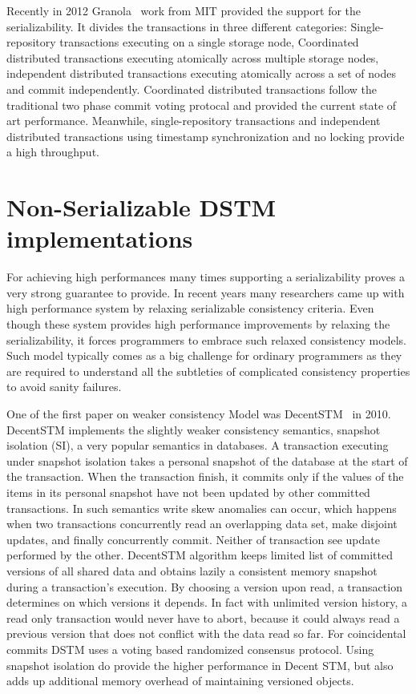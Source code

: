 \documentclass[12pt,english]{report}
\begin{document}
Recently in 2012 Granola~\cite{cowling2012granola} work from MIT provided the support for the serializability. It divides the transactions in three different categories: Single-repository transactions executing on a single storage node, Coordinated distributed transactions executing atomically across multiple storage nodes, independent distributed transactions executing atomically across a set of nodes and commit independently. Coordinated distributed transactions follow the traditional two phase commit voting protocal and provided the current state of art performance. Meanwhile, single-repository transactions and independent distributed transactions using timestamp synchronization and no locking provide a high throughput.  

\section{Non-Serializable DSTM implementations}

For achieving high performances many times supporting a serializability proves a very strong guarantee to provide. In recent years many researchers came up with high performance system by relaxing  serializable consistency criteria. Even though these system provides high performance improvements by relaxing the serializability, it forces programmers to embrace such relaxed consistency models. Such model typically comes as a big challenge for ordinary programmers as they are required to understand all the subtleties of complicated consistency properties to avoid sanity failures.

One of the first paper on weaker consistency Model was DecentSTM~\cite{DecentSTM:5470446} in 2010. DecentSTM implements the slightly weaker consistency semantics, snapshot isolation (SI), a very popular semantics in databases. A transaction executing under snapshot isolation takes a personal snapshot of the database at the start of the transaction. When the transaction finish, it commits only if the values of the items in its personal snapshot have not been updated by other committed transactions. In such semantics write skew anomalies can occur, which happens when two transactions concurrently read an overlapping data set, make disjoint updates, and finally concurrently commit. Neither of transaction see update performed by the other. DecentSTM algorithm keeps limited list of committed versions of all shared data and obtains lazily a consistent memory snapshot during a transaction’s execution. By choosing a version upon read, a transaction determines on which versions it depends. In fact with unlimited version history, a read only transaction would never have to abort, because
it could always read a previous version that does not conflict with the data read so far. For coincidental commits DSTM uses a voting based randomized consensus protocol. Using snapshot isolation do provide the higher performance in Decent STM, but also adds up additional memory overhead of maintaining versioned objects.  
\end{document}
